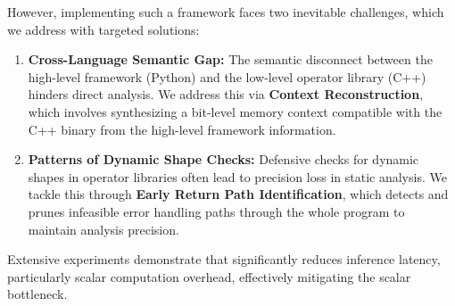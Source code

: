 However, implementing such a framework faces two inevitable challenges, which we address with targeted solutions:
\begin{enumerate}
    \item \textbf{Cross-Language Semantic Gap:} The semantic disconnect between the high-level framework (Python) and the low-level operator library (C++) hinders direct analysis. We address this via \textbf{Context Reconstruction}, which involves synthesizing a bit-level memory context compatible with the C++ binary from the high-level framework information.
    \item \textbf{Patterns of Dynamic Shape Checks:} Defensive checks for dynamic shapes in operator libraries often lead to precision loss in static analysis. We tackle this through \textbf{Early Return Path Identification}, which detects and prunes infeasible error handling paths through the whole program to maintain analysis precision.
\end{enumerate}


Extensive experiments demonstrate that \mysys significantly reduces inference latency, particularly scalar computation overhead, effectively mitigating the scalar bottleneck.





